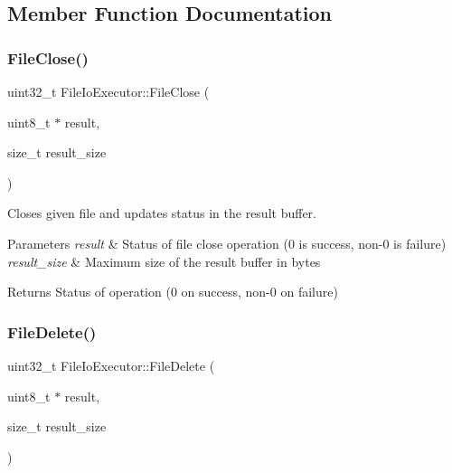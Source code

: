 \subsection{Member Function Documentation}
\mbox{\label{classFileIoExecutor_aebfb27eafb883fd43b4829011b7b451d}} 
\subsubsection{\texorpdfstring{File\+Close()}{FileClose()}}
{\footnotesize\ttfamily uint32\+\_\+t File\+Io\+Executor\+::\+File\+Close (\begin{DoxyParamCaption}\item[{uint8\+\_\+t $\ast$}]{result,  }\item[{size\+\_\+t}]{result\+\_\+size }\end{DoxyParamCaption})}

Closes given file and updates status in the result buffer.


\begin{DoxyParams}{Parameters}
{\em result} & Status of file close operation (0 is success, non-\/0 is failure) \\
\hline
{\em result\+\_\+size} & Maximum size of the result buffer in bytes \\
\hline
\end{DoxyParams}
\begin{DoxyReturn}{Returns}
Status of operation (0 on success, non-\/0 on failure) 
\end{DoxyReturn}
\mbox{\label{classFileIoExecutor_a78b681e94e8a568bb8981ce6eb1fac62}} 
\subsubsection{\texorpdfstring{File\+Delete()}{FileDelete()}}
{\footnotesize\ttfamily uint32\+\_\+t File\+Io\+Executor\+::\+File\+Delete (\begin{DoxyParamCaption}\item[{uint8\+\_\+t $\ast$}]{result,  }\item[{size\+\_\+t}]{result\+\_\+size }\end{DoxyParamCaption})}

